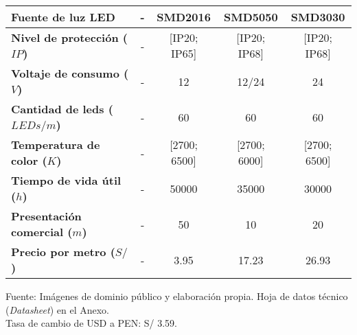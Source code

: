 \begin{savenotes}
\begin{mytable}[H]
\begin{tabular}{l|c|c|c|c|}
{\begin{minipage}{\myforthmaxsizeofcontenttable}
					\textbf{Fuente de luz LED}
				\end{minipage}
			} & - & SMD2016 & SMD5050 & SMD3030 \\ \hline
			\multicolumn{1}{|l|}{
				\begin{minipage}{\myforthmaxsizeofcontenttable}	
					\textbf{Nivel de protección ($IP$)}
				\end{minipage}
			} & - & [IP20; IP65] & [IP20; IP68] & [IP20; IP68] \\ \hline
			\multicolumn{1}{|l|}{
				\begin{minipage}{\myforthmaxsizeofcontenttable}	
					\textbf{Voltaje de consumo ($V$)}
				\end{minipage}
			} & - & 12 & 12/24 & 24 \\ \hline
			\multicolumn{1}{|l|}{
				\begin{minipage}{\myforthmaxsizeofcontenttable}	
					\textbf{Cantidad de leds ($LEDs/m$)}
				\end{minipage}
			} & - & 60 & 60 & 60 \\ \hline
			\multicolumn{1}{|l|}{
				\begin{minipage}{\myforthmaxsizeofcontenttable}	
					\textbf{Temperatura de color ($K$)}
				\end{minipage}
			} & - & [2700; 6500] & [2700; 6000] & [2700; 6500] \\ \hline
			\multicolumn{1}{|l|}{
				\begin{minipage}{\myforthmaxsizeofcontenttable}	
					\textbf{Tiempo de vida útil ($h$)}
				\end{minipage}
			} & - & 50000 & 35000 & 30000 \\ \hline
			\multicolumn{1}{|l|}{
				\begin{minipage}{\myforthmaxsizeofcontenttable}	
					\textbf{Presentación comercial ($m$)}
				\end{minipage}
			} & - & 50 & 10 & 20 \\ \hline
			\multicolumn{1}{|l|}{
				\begin{minipage}{\myforthmaxsizeofcontenttable}	
					\textbf{Precio por metro ($S/$)}
				\end{minipage}
			} & - & 3.95 & 17.23 & 26.93 \\ \hline
		\end{tabular}
		\begin{flushleft}	
			Fuente: Imágenes de dominio público y elaboración propia. Hoja de datos técnico (\textit{Datasheet}) en el Anexo.\\
			Tasa de cambio de USD a PEN: S/ 3.59.
		\end{flushleft}
	\end{mytable}
\end{savenotes}

